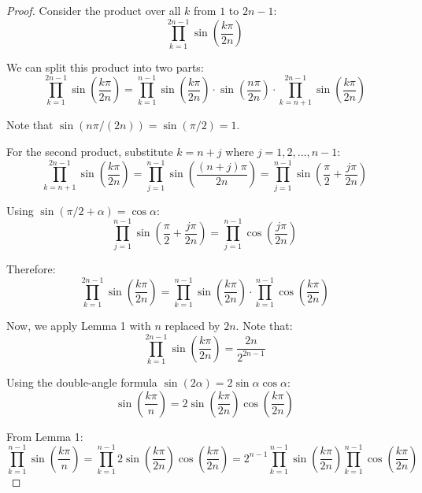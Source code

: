 \documentclass{article}
\begin{document}
\begin{proof}
Consider the product over all $k$ from $1$ to $2n-1$:
\begin{equation}
\prod_{k=1}^{2n-1}\sin\left(\frac{k\pi}{2n}\right)
\end{equation}

We can split this product into two parts:
\begin{equation}
\prod_{k=1}^{2n-1}\sin\left(\frac{k\pi}{2n}\right) = \prod_{k=1}^{n-1}\sin\left(\frac{k\pi}{2n}\right) \cdot \sin\left(\frac{n\pi}{2n}\right) \cdot \prod_{k=n+1}^{2n-1}\sin\left(\frac{k\pi}{2n}\right)
\end{equation}

Note that $\sin(n\pi/(2n)) = \sin(\pi/2) = 1$.

For the second product, substitute $k = n + j$ where $j = 1, 2, \ldots, n-1$:
\begin{equation}
\prod_{k=n+1}^{2n-1}\sin\left(\frac{k\pi}{2n}\right) = \prod_{j=1}^{n-1}\sin\left(\frac{(n+j)\pi}{2n}\right) = \prod_{j=1}^{n-1}\sin\left(\frac{\pi}{2} + \frac{j\pi}{2n}\right)
\end{equation}

Using $\sin(\pi/2 + \alpha) = \cos\alpha$:
\begin{equation}
\prod_{j=1}^{n-1}\sin\left(\frac{\pi}{2} + \frac{j\pi}{2n}\right) = \prod_{j=1}^{n-1}\cos\left(\frac{j\pi}{2n}\right)
\end{equation}

Therefore:
\begin{equation}
\prod_{k=1}^{2n-1}\sin\left(\frac{k\pi}{2n}\right) = \prod_{k=1}^{n-1}\sin\left(\frac{k\pi}{2n}\right) \cdot \prod_{k=1}^{n-1}\cos\left(\frac{k\pi}{2n}\right)
\end{equation}

Now, we apply Lemma 1 with $n$ replaced by $2n$. Note that:
\begin{equation}
\prod_{k=1}^{2n-1}\sin\left(\frac{k\pi}{2n}\right) = \frac{2n}{2^{2n-1}}
\end{equation}

Using the double-angle formula $\sin(2\alpha) = 2\sin\alpha\cos\alpha$:
\begin{equation}
\sin\left(\frac{k\pi}{n}\right) = 2\sin\left(\frac{k\pi}{2n}\right)\cos\left(\frac{k\pi}{2n}\right)
\end{equation}

From Lemma 1:
\begin{equation}
\prod_{k=1}^{n-1}\sin\left(\frac{k\pi}{n}\right) = \prod_{k=1}^{n-1}2\sin\left(\frac{k\pi}{2n}\right)\cos\left(\frac{k\pi}{2n}\right) = 2^{n-1}\prod_{k=1}^{n-1}\sin\left(\frac{k\pi}{2n}\right)\prod_{k=1}^{n-1}\cos\left(\frac{k\pi}{2n}\right)
\end{equation}


\end{proof}
\end{document}
